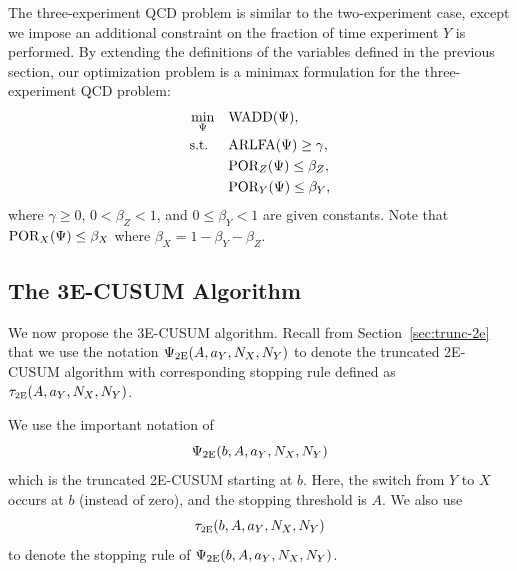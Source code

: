 \documentclass[journal, onecolumn]{IEEEtran}
\begin{document}
The three-experiment QCD problem is similar to the two-experiment case, except we impose an additional constraint on the fraction of time experiment $Y$ is performed. By extending the definitions of the variables defined in the previous section, our optimization problem is a minimax formulation for the three-experiment QCD problem:
\begin{align}
\begin{split}
\min_{\Psi} \quad & \textup{WADD} (\Psi), \\
\text{s.t. } \quad & \textup{ARLFA} (\Psi) \geq \gamma, \\
& \textup{POR}_Z (\Psi) \leq \beta_Z, \\
& \textup{POR}_Y (\Psi) \leq \beta_Y,
\end{split}
\end{align}
where $\gamma \geq 0$, $0 < \beta_Z < 1$, and $0 \leq \beta_Y < 1$ are given constants. Note that $\textup{POR}_X (\Psi) \leq \beta_X$ where $\beta_X = 1 - \beta_Y - \beta_Z$.




\subsection{The \textup{3E-CUSUM} Algorithm}
\label{sec:3e-cusum}

We now propose the 3E-CUSUM algorithm. Recall from Section~\ref{sec:trunc-2e} that we use the notation 
$\Psi_{\textup{2E}} (A, a_Y, N_X, N_Y)$ to denote the truncated 2E-CUSUM algorithm with corresponding stopping rule defined as $\tau_{\textup{\fontsize{6 pt}{10 pt}\selectfont 2E}}(A, a_Y, N_X, N_Y)$. 

We use the important notation of
$$ \Psi_{\textup{2E}} (b,  A, a_Y, N_X, N_Y) $$
which is the truncated 2E-CUSUM starting at $b$. Here, the switch from $Y$ to $X$ occurs at $b$ (instead of zero), and the stopping threshold is $A$.  We also use 
$$ \tau_{\textup{\fontsize{6 pt}{10 pt}\selectfont 2E}}(b, A, a_Y, N_X, N_Y) $$
to denote the stopping rule of $\Psi_{\textup{2E}} (b, A, a_Y, N_X, N_Y)$.
\end{document}
